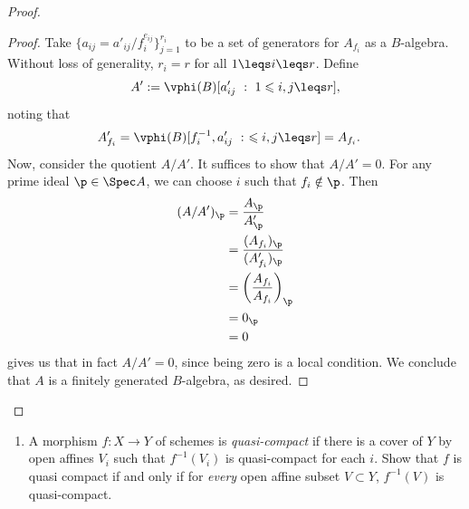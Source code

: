\documentclass[12pt]{amsart}
\begin{document}
\begin{proof}
  \begin{proof}
    Take $\{a_{ij}=a'_{i j}/f_i^{e_{ij}}\}_{j=1}^{r_i}$ to be a set of generators for $A_{f_i}$ as a $B$-algebra. %
    Without loss of generality, $r_i=r$ for all $1\leqs i\leqs r$.
    Define
    \[
      A' := \vphi(B)[a'_{ij}~:~1\leqslant i,j\leqs r],
    \] 
    noting that
    \begin{align*}
      A'_{f_i} &= \vphi(B)[f_i^{-1},a'_{ij}~:~\leqslant i,j\leqs r]= A_{f_i}.
    \end{align*}
    Now, consider the quotient $A/A'$.
    It suffices to show that $A/A'=0$.
    For any prime ideal $\p\in \Spec A$, we can choose $i$ such that $f_i\notin \p$.
    Then
    \begin{align*}
      (A/A')_\p &= \frac{A_\p}{A'_\p} \\
                &= \frac{(A_{f_i})_\p} {(A'_{f_i})_\p} \\
                &= \left(\frac{A_{f_i}}{A_{f_i}}\right)_\p \\
                &= 0_\p \\
                &= 0
    \end{align*}
    gives us that in fact $A/A'=0$, since being zero is a local condition.
    We conclude that $A$ is a finitely generated $B$-algebra, as desired.
  \end{proof}
\end{proof}
 
 \begin{enumerate}
 	\item[3.2.] {
       A morphism $f:X\to Y$ of schemes is \emph{quasi-compact} if there is a cover of $Y$ by open affines $V_i$ such that $f^{-1}(V_i)$ is quasi-compact for each $i$.
       Show that $f$ is quasi compact if and only if for \emph{every} open affine subset $V\subset Y$, $f^{-1}(V)$ is quasi-compact.
     }
 \end{enumerate}
 
\end{document}
